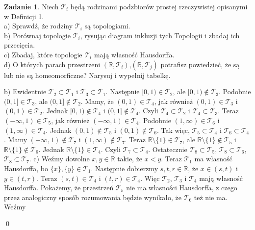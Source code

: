 \documentclass{article}
\theoremstyle{definition}%
\theoremstyle{theorem}
\newtheorem{zad}{Zadanie}
\renewenvironment{proof}{{\bfseries Rozwiązanie}}{\qed}
\begin{document}
	\begin{zad}
		Niech $\mathcal{T}_{i}$ będą rodzinami podzbiorów prostej rzeczywistej opisanymi w Definicji 1.\\
		a) Sprawdź, że rodziny $\mathcal{T}_{i}$ są topologiami.\\
		b) Porównaj topologie $\mathcal{T}_{i}$, rysując diagram inkluzji tych Topologii i zbadaj ich przecięcia.\\
		c) Zbadaj, które topologie $\mathcal{T}_{i}$ mają własność Hausdorffa.\\
		d) O których parach przestrzeni $(\mathbb{R},\mathcal{T}_{i})$,$(\mathbb{R},\mathcal{T}_{j})$ potrafisz powiedzieć, że są lub nie są homeomorficzne? Narysuj i wypełnij tabelkę.
	\end{zad}
	\begin{proof}
	b) Ewidentnie $\mathcal{T}_{2}\subset\mathcal{T}_{1}$ i $\mathcal{T}_{3}\subset\mathcal{T}_{1}$. Następnie $[0,1)\in\mathcal{T}_{2}$, ale $[0,1)\not\in\mathcal{T}_{3}$. Podobnie $(0,1]\in\mathcal{T}_{3}$, ale $(0,1]\not\in\mathcal{T}_{2}$. Mamy, że $(0,1)\in\mathcal{T}_{4}$, jak również $(0,1)\in\mathcal{T}_{3}$ i $(0,1)\in\mathcal{T}_{2}$. Jednak $[0,1)\not\in\mathcal{T}_{4}$ i $(0,1]\not\in\mathcal{T}_{4}$. Czyli $\mathcal{T}_{4}\subset\mathcal{T}_{2}$ i $\mathcal{T}_{4}\subset\mathcal{T}_{3}$. Teraz $(-\infty,1)\in\mathcal{T}_{5}$, jak również $(-\infty,1)\in\mathcal{T}_{4}$. Podobnie $(1, \infty)\in\mathcal{T}_{6}$ i $(1, \infty)\in\mathcal{T}_{4}$. Jednak $(0,1)\not\in\mathcal{T}_{5}$ i $(0,1)\not\in\mathcal{T}_{6}$. Tak więc, $\mathcal{T}_{5}\subset\mathcal{T}_{4}$ i $\mathcal{T}_{6}\subset\mathcal{T}_{4}$. Mamy $(-\infty,1)\not\in\mathcal{T}_{7}$ i $(1, \infty)\not\in\mathcal{T}_{7}$. Teraz $\mathbb{R}\setminus\{1\}\in\mathcal{T}_{7}$, ale $\mathbb{R}\setminus\{1\}\not\in\mathcal{T}_{5}$ i $\mathbb{R}\setminus\{1\}\not\in\mathcal{T}_{6}$. Jednak $\mathbb{R}\setminus\{1\}\in\mathcal{T}_{4}$. Czyli $\mathcal{T}_{7}\subset\mathcal{T}_{4}$. Ostatecznie $\mathcal{T}_{8}\subset\mathcal{T}_{5}$, $\mathcal{T}_{8}\subset\mathcal{T}_{6}$,
	$\mathcal{T}_{8}\subset\mathcal{T}_{7}$.
	c) Weźmy dowolne $x,y\in\mathbb{R}$ takie, że $x<y$. Teraz $\mathcal{T}_{1}$ ma własność Hausdorffa, bo $\{x\},\{y\}\in\mathcal{T}_{1}$. Następnie dobierzmy $s,t,r\in\mathbb{R}$, że $x\in(s,t)$ i $y\in(t,r)$. Teraz  $(s,t)\in\mathcal{T}_{4}$ i $(t,r)\in\mathcal{T}_{4}$. Więc $\mathcal{T}_{2}$, $\mathcal{T}_{3}$ i $\mathcal{T}_{4}$ mają własność Hausdorffa.
	Pokażemy,  że przestrzeń $\mathcal{T}_{5}$ nie ma własności Hausdorffa, z czego przez analogiczny sposób rozumowania będzie wynikało, że $\mathcal{T}_{6}$ też nie ma. Weźmy 

\end{proof}
\end{document}

